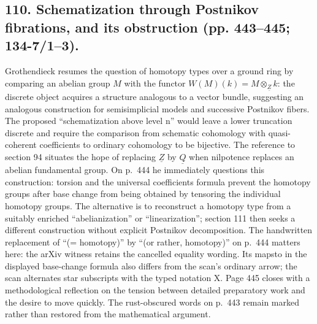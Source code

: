 \documentclass[10pt,oneside]{book}
\begin{document}
\subsection*{110. Schematization through Postnikov fibrations, and its obstruction (pp. 443--445; 134-7/1--3).}
Grothendieck resumes the question of homotopy types over a ground ring by comparing an abelian group $M$ with the functor $W(M)(k)=M\otimes_{\underline Z}k$: the discrete object acquires a structure analogous to a vector bundle, suggesting an analogous construction for semisimplicial models and successive Postnikov fibers. The proposed ``schematization above level n'' would leave a lower truncation discrete and require the comparison from schematic cohomology with quasi-coherent coefficients to ordinary cohomology to be bijective. The reference to section 94 situates the hope of replacing $\underline Z$ by $\underline Q$ when nilpotence replaces an abelian fundamental group. On p.~444 he immediately questions this construction: torsion and the universal coefficients formula prevent the homotopy groups after base change from being obtained by tensoring the individual homotopy groups. The alternative is to reconstruct a homotopy type from a suitably enriched ``abelianization'' or ``linearization''; section 111 then seeks a different construction without explicit Postnikov decomposition. The handwritten replacement of ``(= homotopy)'' by ``(or rather, homotopy)'' on p.~444 matters here: the arXiv witness retains the cancelled equality wording. Its mapsto in the displayed base-change formula also differs from the scan's ordinary arrow; the scan alternates star subscripts with the typed notation X. Page 445 closes with a methodological reflection on the tension between detailed preparatory work and the desire to move quickly. The rust-obscured words on p.~443 remain marked rather than restored from the mathematical argument.
\end{document}
